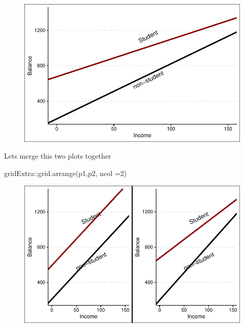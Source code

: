 \documentclass[
  letterpaper,
  DIV=11,
  numbers=noendperiod]{scrreprt}
\newenvironment{Shaded}{\begin{snugshade}}{\end{snugshade}}
\newcommand{\AttributeTok}[1]{\textcolor[rgb]{0.65,0.35,0.00}{#1}}
\newcommand{\DecValTok}[1]{\textcolor[rgb]{0.47,0.16,0.63}{#1}}
\newcommand{\FunctionTok}[1]{\textcolor[rgb]{0.02,0.16,0.49}{#1}}
\newcommand{\NormalTok}[1]{\textcolor[rgb]{0.33,0.33,0.33}{#1}}
\newcommand{\SpecialCharTok}[1]{\textcolor[rgb]{0.00,0.46,0.62}{#1}}
\begin{document}
\begin{figure}[H]

{\centering \includegraphics{Chapter3_files/figure-pdf/unnamed-chunk-83-1.pdf}

}

\end{figure}

Lets merge this two plots together

\begin{Shaded}
\begin{Highlighting}[]
\NormalTok{gridExtra}\SpecialCharTok{::}\FunctionTok{grid.arrange}\NormalTok{(p1,p2, }\AttributeTok{ncol =}\DecValTok{2}\NormalTok{)}
\end{Highlighting}
\end{Shaded}

\begin{figure}[H]

{\centering \includegraphics{Chapter3_files/figure-pdf/unnamed-chunk-84-1.pdf}

}

\end{figure}
\end{document}
